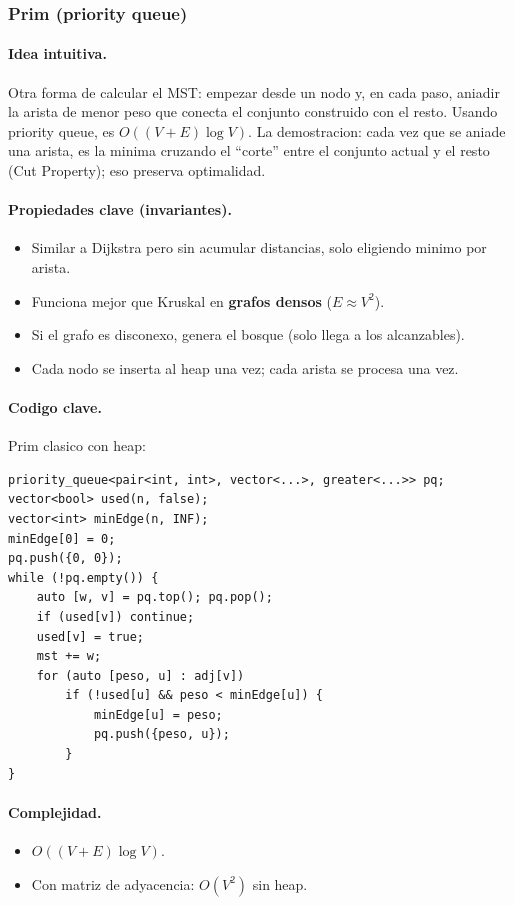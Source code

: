 ﻿\subsubsection{Prim (priority queue)}

\paragraph{Idea intuitiva.}
Otra forma de calcular el MST: empezar desde un nodo y, en cada paso, aniadir la arista de menor peso que conecta el conjunto construido con el resto. Usando priority queue, es $O((V + E) \log V)$. La demostracion: cada vez que se aniade una arista, es la minima cruzando el ``corte'' entre el conjunto actual y el resto (Cut Property); eso preserva optimalidad.

\paragraph{Propiedades clave (invariantes).}
\begin{itemize}\setlength\itemsep{0pt}
	\item Similar a Dijkstra pero sin acumular distancias, solo eligiendo minimo por arista.
	\item Funciona mejor que Kruskal en \textbf{grafos densos} ($E \approx V^2$).
	\item Si el grafo es disconexo, genera el bosque (solo llega a los alcanzables).
	\item Cada nodo se inserta al heap una vez; cada arista se procesa una vez.
\end{itemize}

\paragraph{Codigo clave.}
Prim clasico con heap:
\begin{verbatim}
priority_queue<pair<int, int>, vector<...>, greater<...>> pq;
vector<bool> used(n, false);
vector<int> minEdge(n, INF);
minEdge[0] = 0;
pq.push({0, 0});
while (!pq.empty()) {
    auto [w, v] = pq.top(); pq.pop();
    if (used[v]) continue;
    used[v] = true;
    mst += w;
    for (auto [peso, u] : adj[v])
        if (!used[u] && peso < minEdge[u]) {
            minEdge[u] = peso;
            pq.push({peso, u});
        }
}
\end{verbatim}

\paragraph{Complejidad.}
\begin{itemize}\setlength\itemsep{0pt}
	\item $O((V + E) \log V)$.
	\item Con matriz de adyacencia: $O(V^2)$ sin heap.
\end{itemize}

